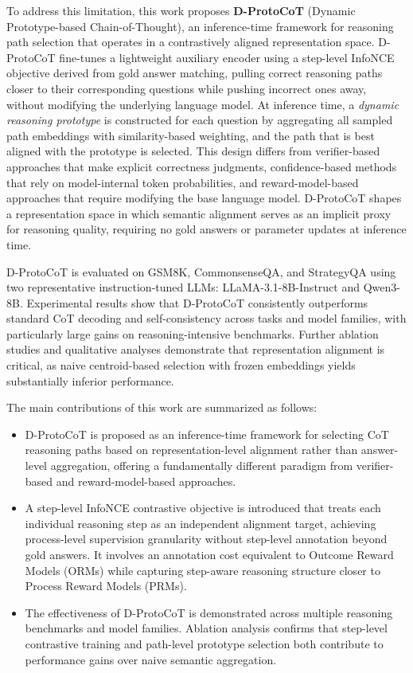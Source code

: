 \documentclass[a4paper,fleqn]{cas-dc}
\begin{document}
To address this limitation, this work proposes \textbf{D-ProtoCoT} (Dynamic Prototype-based Chain-of-Thought), an inference-time framework for reasoning path selection that operates in a contrastively aligned representation space.
D-ProtoCoT fine-tunes a lightweight auxiliary encoder using a step-level InfoNCE objective derived from gold answer matching, pulling correct reasoning paths closer to their corresponding questions while pushing incorrect ones away, without modifying the underlying language model.
At inference time, a \emph{dynamic reasoning prototype} is constructed for each question by aggregating all sampled path embeddings with similarity-based weighting, and the path that is best aligned with the prototype is selected.
This design differs from verifier-based approaches \citep{cobbe2021trainingverifiers} that make explicit correctness judgments, confidence-based methods \citep{xiong2024llmsexpressuncertaintyempirical, leang2025picsar} that rely on model-internal token probabilities, and reward-model-based approaches that require modifying the base language model. D-ProtoCoT shapes a representation space in which semantic alignment serves as an implicit proxy for reasoning quality, requiring no gold answers or parameter updates at inference time.

D-ProtoCoT is evaluated on GSM8K, CommonsenseQA, and StrategyQA using two representative instruction-tuned LLMs: LLaMA-3.1-8B-Instruct and Qwen3-8B.
Experimental results show that D-ProtoCoT consistently outperforms standard CoT decoding and self-consistency across tasks and model families, with particularly large gains on reasoning-intensive benchmarks.
Further ablation studies and qualitative analyses demonstrate that representation alignment is critical, as naive centroid-based selection with frozen embeddings yields substantially inferior performance.

The main contributions of this work are summarized as follows:
\begin{itemize}
    \item D-ProtoCoT is proposed as an inference-time framework for selecting CoT reasoning paths based on representation-level alignment rather than answer-level aggregation, offering a fundamentally different paradigm from verifier-based and reward-model-based approaches.
    \item A step-level InfoNCE contrastive objective is introduced that treats each individual reasoning step as an independent alignment target, achieving process-level supervision granularity without step-level annotation beyond gold answers. It involves an annotation cost equivalent to Outcome Reward Models (ORMs) while capturing step-aware reasoning structure closer to Process Reward Models (PRMs).
    \item The effectiveness of D-ProtoCoT is demonstrated across multiple reasoning benchmarks and model families. Ablation analysis confirms that step-level contrastive training and path-level prototype selection both contribute to performance gains over naive semantic aggregation.
\end{itemize}
\end{document}
